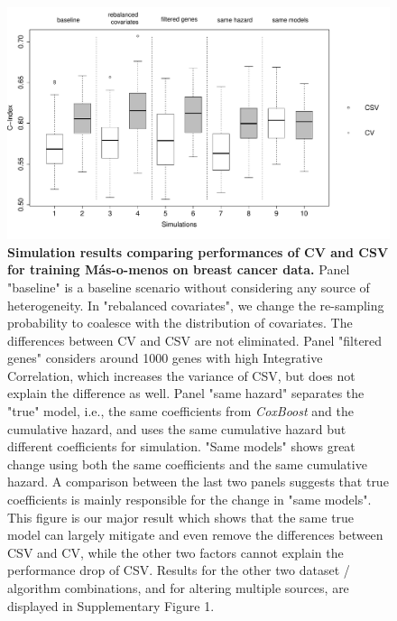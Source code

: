 \documentclass{bioinfo}
\begin{document}
  \begin{figure}[htp]
     \centering
     \includegraphics[width=16cm]{boxplot_breast_masomenos_5panels.pdf}
     \caption{\textbf{Simulation results comparing performances of CV and CSV for training M\'{a}s-o-menos on breast cancer data.} Panel "baseline" is a baseline scenario without considering any source of heterogeneity. In "rebalanced covariates", we change the re-sampling probability to coalesce with the distribution of covariates. The differences between CV and CSV are not eliminated. Panel "filtered genes" considers around 1000 genes with high Integrative Correlation, which increases the variance of CSV, but does not explain the difference as well. Panel "same hazard" separates the "true" model, i.e., the same coefficients from \emph{CoxBoost} and the cumulative hazard, and uses the same cumulative hazard but different coefficients for simulation. "Same models" shows great change using both the same coefficients and the same cumulative hazard. A comparison between the last two panels suggests that true coefficients is mainly responsible for the change in "same models". %
         This figure is our major result which shows that the same true model can largely mitigate and even remove the differences between CSV and CV, while the other two factors cannot explain the performance drop of CSV. Results for the other two dataset / algorithm combinations, and for altering multiple sources, are displayed in Supplementary Figure 1.}
     \label{boxplot_breast_masomenos}
  \end{figure}
\end{document}

